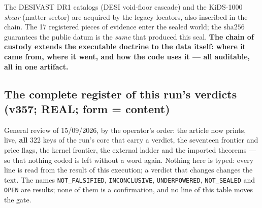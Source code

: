 \documentclass[11pt]{article}
\theoremstyle{definition}\newtheorem{deriv}{Derivation}
\begin{document}
The DESIVAST DR1 catalogs (DESI void-floor cascade) and the KiDS-1000 \emph{shear} (matter sector) are acquired by the legacy locators, also inscribed in the chain. The 17 registered pieces of evidence enter the sealed world; the $\mathrm{sha}256$ guarantees the public datum is the \emph{same} that produced this seal. \textbf{The chain of custody extends the executable doctrine to the data itself: where it came from, where it went, and how the code uses it --- all auditable, all in one artifact.}

\subsection*{The complete register of this run's verdicts (v357; REAL; form = content)}

General review of 15/09/2026, by the operator's order: the article now prints, live, \textbf{all} 322 keys of the run's core that carry a verdict, the seventeen frontier and price flags, the kernel frontier, the external ladder and the imported theorems --- so that nothing coded is left without a word again. Nothing here is typed: every line is read from the result of this execution; a verdict that changes changes the text. The names \texttt{NOT\_FALSIFIED}, \texttt{INCONCLUSIVE}, \texttt{UNDERPOWERED}, \texttt{NOT\_SEALED} and \texttt{OPEN} are results; none of them is a confirmation, and no line of this table moves the gate.
\end{document}

